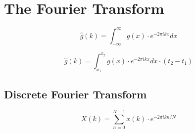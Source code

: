 \section{The Fourier Transform}

\begin{equation}
     \hat g(k) = \int_{-\infty}^{\infty} g(x) \cdot e^{-2 \pi i k x} dx
\end{equation}

\begin{equation}
     \hat g(k) = \int_{x_1}^{x_2} g(x) \cdot e^{-2 \pi i k x} dx \cdot (t_2 - t_1)
\end{equation}

\subsection{Discrete Fourier Transform}

\begin{equation}
    X(k) = \sum_{n = 0}^{N - 1} x(k) \cdot e^{-2 \pi i kn / N}
\end{equation}
